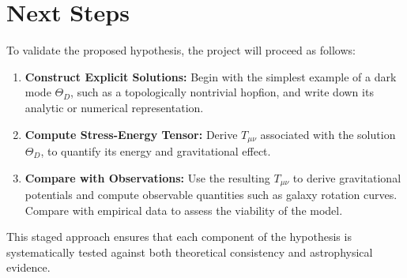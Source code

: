 \documentclass[12pt]{article}
\begin{document}
\section*{Next Steps}
To validate the proposed hypothesis, the project will proceed as follows:

\begin{enumerate}
  \item \textbf{Construct Explicit Solutions:} Begin with the simplest example of a dark mode \( \Theta_D \), such as a topologically nontrivial hopfion, and write down its analytic or numerical representation.
  \item \textbf{Compute Stress-Energy Tensor:} Derive \( T_{\mu\nu} \) associated with the solution \( \Theta_D \), to quantify its energy and gravitational effect.
  \item \textbf{Compare with Observations:} Use the resulting \( T_{\mu\nu} \) to derive gravitational potentials and compute observable quantities such as galaxy rotation curves. Compare with empirical data to assess the viability of the model.
\end{enumerate}

This staged approach ensures that each component of the hypothesis is systematically tested against both theoretical consistency and astrophysical evidence.
\end{document}
